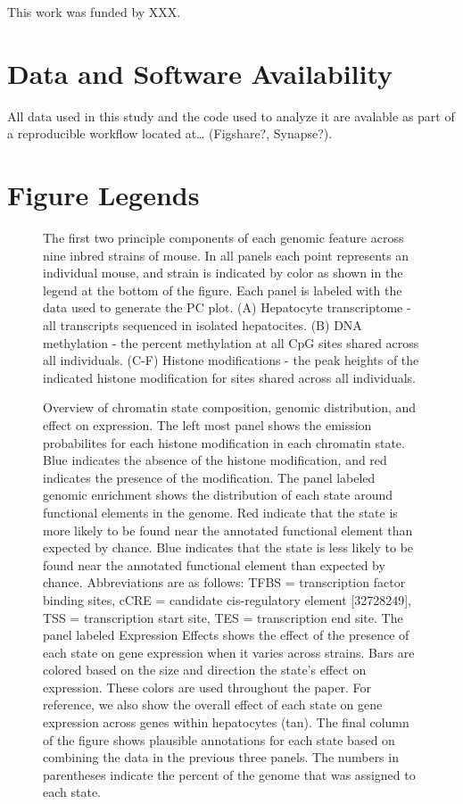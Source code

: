 \documentclass[10pt,letterpaper]{article}
\begin{document}
This work was funded by XXX.

\hypertarget{data-and-software-availability}{%
\section{Data and Software
Availability}\label{data-and-software-availability}}

All data used in this study and the code used to analyze it are avalable
as part of a reproducible workflow located at\ldots{} (Figshare?,
Synapse?).

\hypertarget{figure-legends}{%
\section{Figure Legends}\label{figure-legends}}

\begin{figure}[ht]
\centering
\caption{The first two principle components of each genomic feature across
nine inbred strains of mouse. In all panels each point represents
an individual mouse, and strain is indicated by color as shown in
the legend at the bottom of the figure. Each panel is labeled with
the data used to generate the PC plot. (A) Hepatocyte transcriptome - 
all transcripts sequenced in isolated hepatocites. (B) DNA methylation - 
the percent methylation at all CpG sites shared across all individuals. 
(C-F) Histone modifications - the peak heights of the indicated histone
modification for sites shared across all individuals.}
\label{fig:pc_plots}
\end{figure}

\begin{figure}[ht]
\centering
\caption{Overview of chromatin state composition, genomic distribution,
and effect on expression. The left most panel shows the emission
probabilites for each histone modification in each chromatin state. 
Blue indicates the absence of the histone modification, and red 
indicates the presence of the modification. The panel labeled
genomic enrichment shows the distribution of each state around 
functional elements in the genome. Red indicate that the
state is more likely to be found near the annotated functional 
element than expected by chance. Blue indicates that the state
is less likely to be found near the annotated functional element
than expected by chance. Abbreviations are as follows: TFBS = 
transcription factor binding sites, cCRE = candidate cis-regulatory
element [32728249], TSS = transcription start site, TES = transcription 
end site. The panel labeled Expression Effects shows the effect of the 
presence of each state on gene expression when it varies across strains. 
Bars are colored based on the size and direction the state's effect on
expression. These colors are used throughout the paper. For reference, 
we also show the overall effect of each state on gene expression across 
genes within hepatocytes (tan). The final column of the figure shows 
plausible annotations for each state based on combining the data in the 
previous three panels. The numbers in parentheses indicate the percent of 
the genome that was assigned to each state.}
\label{fig:state_overview}
\end{figure}
\end{document}
